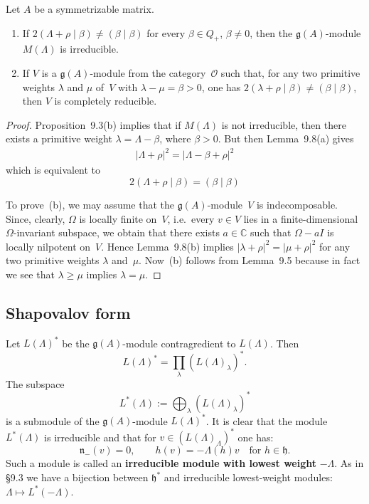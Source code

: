 \documentclass[12pt]{article}
\begin{document}
\begin{proposition}[9.9]
    Let $A$ be a symmetrizable matrix.
    \begin{enumerate}[label=\textup{(\alph*)}]
        \item
              If $2(\Lambda + \rho \mid \beta) \ne (\beta \mid \beta)$ for every $\beta \in Q_+$, $\beta \ne 0$,
              then the $\mathfrak{g}(A)$-module $M(\Lambda)$ is irreducible.

        \item
              If $V$ is a $\mathfrak{g}(A)$-module from the category~$\mathcal{O}$ such that,
              for any two primitive weights $\lambda$ and $\mu$ of~$V$ with $\lambda - \mu = \beta > 0$,
              one has $2(\lambda + \rho \mid \beta) \ne (\beta \mid \beta)$,
              then $V$ is completely reducible.
    \end{enumerate}

    \begin{proof}
        Proposition~9.3(b) implies that if $M(\Lambda)$ is not irreducible,
        then there exists a primitive weight $\lambda = \Lambda - \beta$, where $\beta > 0$.
        But then Lemma~9.8(a) gives
        \begin{align*}
            |\Lambda + \rho|^2 = |\Lambda - \beta + \rho|^2
        \end{align*}
        which is equivalent to
        \[2(\Lambda + \rho \mid \beta) = (\beta \mid \beta)\]


        To prove~(b), we may assume that the $\mathfrak{g}(A)$-module~$V$ is indecomposable.
        Since, clearly, $\Omega$ is locally finite on~$V$, i.e.\ every $v \in V$
        lies in a finite-dimensional $\Omega$-invariant subspace, we obtain that there exists
        $a \in \mathbb{C}$ such that $\Omega - aI$ is locally nilpotent on~$V$.
        Hence Lemma~9.8(b) implies $|\lambda + \rho|^2 = |\mu + \rho|^2$
        for any two primitive weights $\lambda$ and~$\mu$.
        Now~(b) follows from Lemma~9.5 because in fact we see that $\lambda \ge \mu$ implies $\lambda = \mu$.
    \end{proof}
\end{proposition}


\subsection{Shapovalov form}
Let $L(\Lambda)^*$ be the $\mathfrak{g}(A)$-module contragredient to $L(\Lambda)$.
Then
\[
    L(\Lambda)^* = \prod_{\lambda} (L(\Lambda)_\lambda)^*.
\]
The subspace
\[
    L^*(\Lambda) := \bigoplus_{\lambda} (L(\Lambda)_\lambda)^*
\]
is a submodule of the $\mathfrak{g}(A)$-module $L(\Lambda)^*$.
It is clear that the module $L^*(\Lambda)$ is irreducible and that for
$v \in (L(\Lambda)_\Lambda)^*$ one has:
\[
    \mathfrak{n}_-(v) = 0,
    \qquad
    h(v) = -\Lambda(h)v \quad \text{for } h \in \mathfrak{h}.
\]
Such a module is called an \textbf{irreducible module with lowest weight} $-\Lambda$.
As in §9.3 we have a bijection between $\mathfrak{h}^*$ and irreducible lowest-weight
modules: $\Lambda \mapsto L^*(-\Lambda)$.
\end{document}
